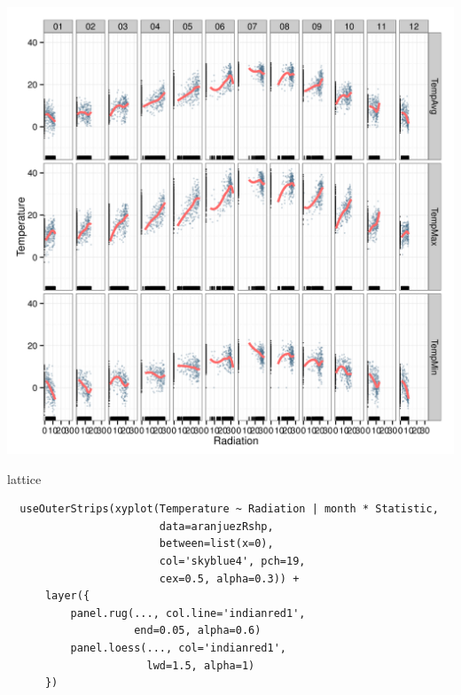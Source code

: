 \documentclass[xcolor={usenames,svgnames,dvipsnames}]{beamer}
\begin{document}
\begin{frame}[label=sec-4-2-3]{}
\includegraphics[width=.9\linewidth]{figs/aranjuezFacetGrid.png}
\end{frame}


\begin{frame}[fragile,label=sec-4-2-4]{lattice}
 \lstset{language=R,label= ,caption= ,numbers=none}
\begin{lstlisting}
  useOuterStrips(xyplot(Temperature ~ Radiation | month * Statistic,
                        data=aranjuezRshp,
                        between=list(x=0),
                        col='skyblue4', pch=19,
                        cex=0.5, alpha=0.3)) +
      layer({
          panel.rug(..., col.line='indianred1',
                    end=0.05, alpha=0.6)
          panel.loess(..., col='indianred1',
                      lwd=1.5, alpha=1)
      })
\end{lstlisting}
\end{frame}
\end{document}
